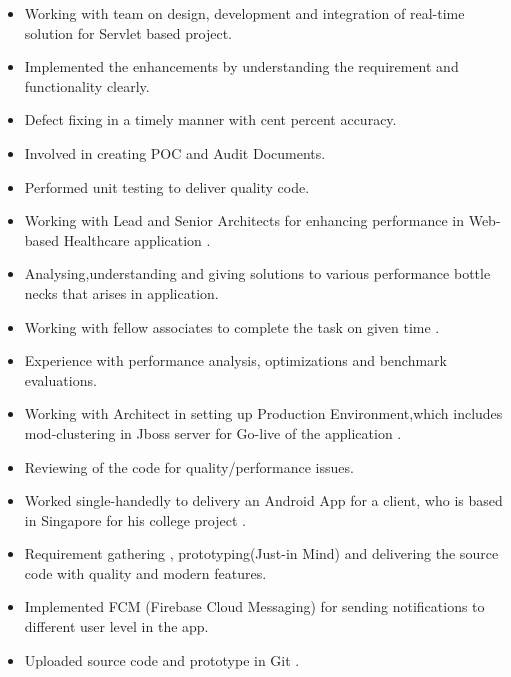 \documentclass[10pt,a4paper,ragged2e]{altacv}
\begin{document}

\begin{itemize}
\item Working with team on design, development and integration of real-time solution for Servlet based project.
\small
\item Implemented the enhancements by understanding the requirement and functionality clearly.
\small
\item Defect fixing in a timely manner with cent percent accuracy.
\small
\item Involved in creating POC and Audit Documents.
\small
\item Performed unit testing to deliver quality code.
\end{itemize}

\divider




\smallskip
{}

\begin{itemize}
\item Working with Lead and Senior Architects for enhancing performance in Web-based Healthcare application .
\small
\item Analysing,understanding and giving solutions to various performance bottle necks that arises in application.
\small
\item Working with fellow associates to complete the task on given time .
\small
\item Experience with performance analysis, optimizations and benchmark evaluations.
\small
\item Working with Architect in setting up Production Environment,which includes mod-clustering in Jboss server for Go-live of the application .
\small
\item Reviewing of the code for quality/performance issues.
\end{itemize}



\smallskip
{}

\begin{itemize}
\item Worked single-handedly to delivery an Android App for a client, who is based in Singapore for his college project .
\small
\item Requirement gathering , prototyping(Just-in Mind) and delivering the source code with quality and modern features.
\small
\item Implemented FCM (Firebase Cloud Messaging) for sending notifications to different user level in the app.
\small
\item Uploaded source code and prototype in Git .
\end{itemize}
\end{document}
